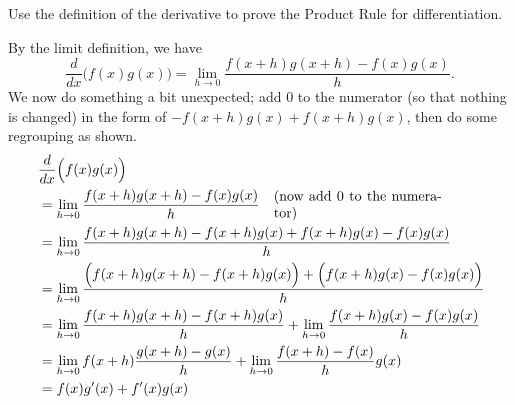 \begin{example} \label{Ex:2.5.Eg1}
Use the definition of the derivative to prove the Product Rule for differentiation.

\solution By the limit definition, we have 
\[ \frac{d}{dx}\Big(f(x)g(x)\Big) =\lim_{h \to 0} \frac{f(x+h)g(x+h)-f(x)g(x)}{h}.\] 
We now do something a bit unexpected; add $0$ to the numerator (so that nothing is changed) in the form of $-f(x+h)g(x)+f(x+h)g(x)$, then do some regrouping as shown.
\begin{align*}
\left.\right.& \frac{d}{dx}\Big(f(x)g(x)\Big) \\
&=\lim_{h\to0} \frac{f(x+h)g(x+h)-f(x)g(x)}{h} \quad \parbox{120pt}{ (now add $0$ to the numerator) } \\
&=	\lim_{h\to0} \frac{f(x+h)g(x+h)-f(x+h)g(x)+f(x+h)g(x)-f(x)g(x)}{h} \\ %
&=	\lim_{h\to0} \frac{\Big(f(x+h)g(x+h)-f(x+h)g(x)\Big)+\Big(f(x+h)g(x)-f(x)g(x)\Big)}{h}\\
&=	\lim_{h\to0} \frac{f(x+h)g(x+h)-f(x+h)g(x)}{h}+\lim_{h\to0}\frac{f(x+h)g(x)-f(x)g(x)}{h} \\ %
&=\lim_{h\to0} f(x+h)\frac{g(x+h)-g(x)}{h}+\lim_{h\to0}\frac{f(x+h)-f(x)}{h}g(x) \\ %
&=f(x)g'(x) + \fp(x)g(x)
\end{align*}
\end{example}